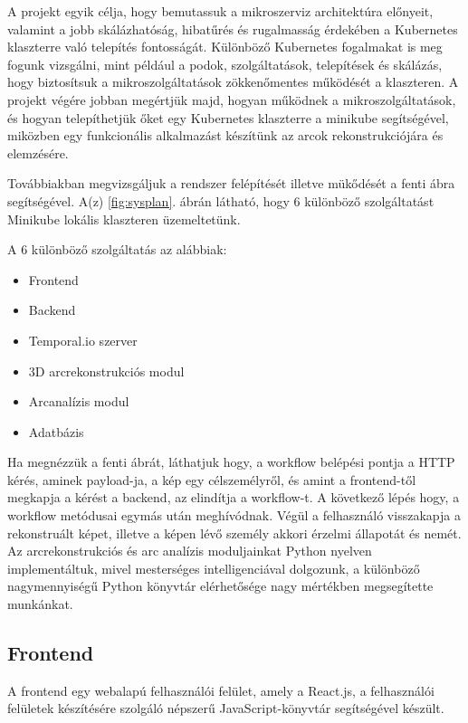 \documentclass[12pt,a4]{article}
\begin{document}
            A projekt egyik célja, hogy bemutassuk a mikroszerviz architektúra előnyeit, valamint a jobb skálázhatóság, hibatűrés és rugalmasság érdekében a Kubernetes klaszterre való telepítés fontosságát. Különböző Kubernetes fogalmakat is meg fogunk vizsgálni, mint például a podok, szolgáltatások, telepítések és skálázás, hogy biztosítsuk a mikroszolgáltatások zökkenőmentes működését a klaszteren. A projekt végére jobban megértjük majd, hogyan működnek a mikroszolgáltatások, és hogyan telepíthetjük őket egy Kubernetes klaszterre a minikube segítségével, miközben egy funkcionális alkalmazást készítünk az arcok rekonstrukciójára és elemzésére.

        	Továbbiakban megvizsgáljuk a rendszer felépítését illetve mükődését a
        	fenti ábra segítségével. A(z) \ref{fig:sysplan}. ábrán látható, hogy 6 különböző szolgáltatást Minikube lokális klaszteren üzemeltetünk.

        	A 6 különböző szolgáltatás az alábbiak:
        	\begin{itemize}
        		\item Frontend
        		\item Backend
        		\item Temporal.io szerver
        		\item 3D arcrekonstrukciós modul
        		\item Arcanalízis modul
        		\item Adatbázis
        	\end{itemize}
        
        	Ha megnézzük a fenti ábrát, láthatjuk hogy, a workflow belépési pontja a HTTP kérés, aminek payload-ja, a kép egy célszemélyről, és amint a
        	frontend-től megkapja a kérést a backend, az elindítja a workflow-t. A következő lépés hogy, a workflow metódusai egymás után meghívódnak.
        	Végül a felhasználó visszakapja a rekonstruált képet, illetve a képen lévő személy akkori érzelmi állapotát és nemét. Az arcrekonstrukciós és arc analízis moduljainkat Python nyelven implementáltuk, mivel mesterséges intelligenciával dolgozunk, a különböző nagymennyiségű Python könyvtár elérhetősége nagy mértékben megsegítette munkánkat.
        
        \subsection{Frontend}

            A frontend egy webalapú felhasználói felület, amely a React.js, a felhasználói felületek készítésére szolgáló népszerű JavaScript-könyvtár segítségével készült.
\end{document}
